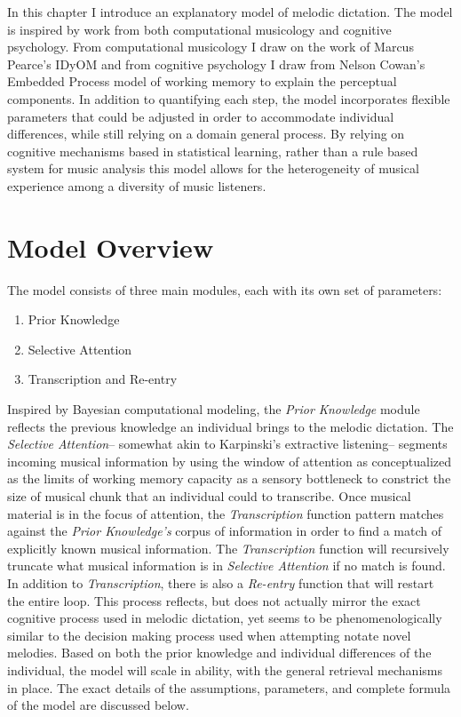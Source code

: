 \documentclass[]{book}
\providecommand{\tightlist}{%
  \setlength{\itemsep}{0pt}\setlength{\parskip}{0pt}}
\begin{document}
In this chapter I introduce an explanatory model of melodic dictation.
The model is inspired by work from both computational musicology and cognitive psychology.
From computational musicology I draw on the work of Marcus Pearce's IDyOM \citep{pearceConstructionEvaluationStatistical2005} and from cognitive psychology I draw from Nelson Cowan's Embedded Process model of working memory \citep{cowanEvolvingConceptionsMemory1988, cowanMagicalMysteryFour2010} to explain the perceptual components.
In addition to quantifying each step, the model incorporates flexible parameters that could be adjusted in order to accommodate individual differences, while still relying on a domain general process.
By relying on cognitive mechanisms based in statistical learning, rather than a rule based system for music analysis \citep{lerdahlGenerativeTheoryTonal1986, narmourAnalysisCognitionBasic1990, narmourAnalysisCognitionMelodic1992, temperleyCognitionBasicMusical2004} this model allows for the heterogeneity of musical experience among a diversity of music listeners.

\hypertarget{model-overview}{%
\section{Model Overview}\label{model-overview}}

The model consists of three main modules, each with its own set of parameters:

\begin{enumerate}
\def\labelenumi{\arabic{enumi}.}
\tightlist
\item
  Prior Knowledge
\item
  Selective Attention
\item
  Transcription and Re-entry
\end{enumerate}

Inspired by Bayesian computational modeling, the \emph{Prior Knowledge} module reflects the previous knowledge an individual brings to the melodic dictation.
The \emph{Selective Attention}-- somewhat akin to Karpinski's extractive listening-- segments incoming musical information by using the window of attention as conceptualized as the limits of working memory capacity as a sensory bottleneck to constrict the size of musical chunk that an individual could to transcribe.
Once musical material is in the focus of attention, the \emph{Transcription} function pattern matches against the \emph{Prior Knowledge's} corpus of information in order to find a match of explicitly known musical information.
The \emph{Transcription} function will recursively truncate what musical information is in \emph{Selective Attention} if no match is found.
In addition to \emph{Transcription}, there is also a \emph{Re-entry} function that will restart the entire loop.
This process reflects, but does not actually mirror the exact cognitive process used in melodic dictation, yet seems to be phenomenologically similar to the decision making process used when attempting notate novel melodies.
Based on both the prior knowledge and individual differences of the individual, the model will scale in ability, with the general retrieval mechanisms in place.
The exact details of the assumptions, parameters, and complete formula of the model are discussed below.
\end{document}
